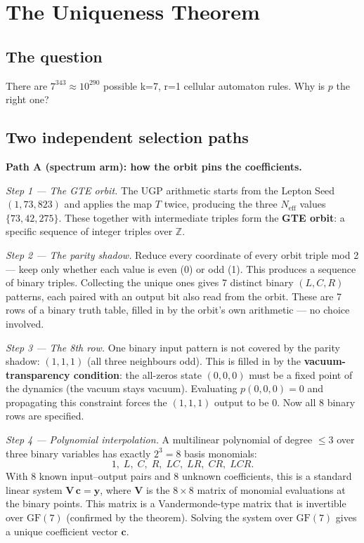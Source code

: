 \documentclass[11pt,a4paper]{article}
\newcommand{\term}[1]{\textbf{#1}}
\begin{document}
\section{The Uniqueness Theorem}

\subsection{The question}

There are $7^{343} \approx 10^{290}$ possible k=7, r=1 cellular automaton
rules.  Why is $p$ the right one?

\subsection{Two independent selection paths}

\textbf{Path A (spectrum arm): how the orbit pins the coefficients.}

\medskip
\noindent\textit{Step 1 — The GTE orbit.}
The UGP arithmetic starts from the Lepton Seed $(1, 73, 823)$ and applies
the map $T$ twice, producing the three $N_{\mathrm{eff}}$ values
$\{73, 42, 275\}$.  These together with intermediate triples form the
\term{GTE orbit}: a specific sequence of integer triples over $\mathbb{Z}$.

\medskip
\noindent\textit{Step 2 — The parity shadow.}
Reduce every coordinate of every orbit triple mod 2 — keep only whether each
value is even (0) or odd (1).  This produces a sequence of binary triples.
Collecting the unique ones gives 7 distinct binary $(L, C, R)$ patterns,
each paired with an output bit also read from the orbit.  These are 7 rows
of a binary truth table, filled in by the orbit's own arithmetic — no choice
involved.

\medskip
\noindent\textit{Step 3 — The 8th row.}
One binary input pattern is not covered by the parity shadow: $(1, 1, 1)$
(all three neighbours odd).  This is filled in by the
\term{vacuum-transparency condition}: the all-zeros state $(0,0,0)$ must be
a fixed point of the dynamics (the vacuum stays vacuum).  Evaluating $p(0,0,0)=0$
and propagating this constraint forces the $(1,1,1)$ output to be 0.
Now all 8 binary rows are specified.

\medskip
\noindent\textit{Step 4 — Polynomial interpolation.}
A multilinear polynomial of degree $\leq 3$ over three binary variables has
exactly $2^3 = 8$ basis monomials:
\[
  1,\; L,\; C,\; R,\; LC,\; LR,\; CR,\; LCR.
\]
With 8 known input--output pairs and 8 unknown coefficients, this is a
standard linear system $\mathbf{V}\,\mathbf{c} = \mathbf{y}$, where
$\mathbf{V}$ is the $8\times8$ matrix of monomial evaluations at the binary
points.  This matrix is a Vandermonde-type matrix that is invertible over
$\mathrm{GF}(7)$ (confirmed by the theorem).  Solving the system over
$\mathrm{GF}(7)$ gives a unique coefficient vector $\mathbf{c}$.
\end{document}
